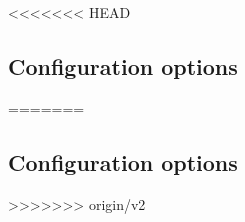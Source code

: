 <<<<<<< HEAD
\label{chapter:installation}

\subsection{Configuration options}


=======
\label{chapter:installation}

\subsection{Configuration options}


>>>>>>> origin/v2
